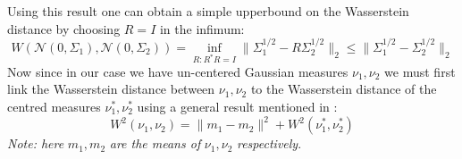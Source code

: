 Using this result one can obtain a simple upperbound on the Wasserstein distance by choosing $R=I$ in the infimum:
\begin{equation*}
    W(\mathcal{N}(0,\Sigma_1),\mathcal{N}(0,\Sigma_2))=\inf_{R:R^{*}R=I}\|\Sigma_{1}^{1/2}-R\Sigma_{2}^{1/2}\|_{2} \leq \|\Sigma_{1}^{1/2}-\Sigma_{2}^{1/2}\|_{2}
\end{equation*}
Now since in our case we have un-centered Gaussian measures $\nu_{1},\nu_{2}$ we must first link the Wasserstein distance between $\nu_1,\nu_2$ to the Wasserstein distance of the centred measures $\nu_{1}^{*},\nu_{2}^{*}$ using a general result mentioned in \cite{cuesta1996lower}:
\begin{equation*}
    W^2(\nu_{1},\nu_{2})=\|m_1-m_2\|^{2}+W^{2}(\nu_{1}^*,\nu_{2}^{*})
\end{equation*}
\textit{Note: here} $m_1,m_2$ \textit{are the means of} $\nu_{1},\nu_{2}$ \textit{respectively}. \\

